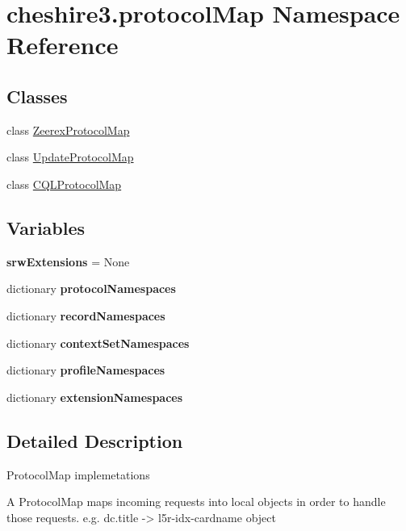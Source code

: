 \hypertarget{namespacecheshire3_1_1protocol_map}{\section{cheshire3.\-protocol\-Map Namespace Reference}
\label{namespacecheshire3_1_1protocol_map}
}
\subsection*{Classes}
\begin{DoxyCompactItemize}
\item 
class \hyperlink{classcheshire3_1_1protocol_map_1_1_zeerex_protocol_map}{Zeerex\-Protocol\-Map}
\item 
class \hyperlink{classcheshire3_1_1protocol_map_1_1_update_protocol_map}{Update\-Protocol\-Map}
\item 
class \hyperlink{classcheshire3_1_1protocol_map_1_1_c_q_l_protocol_map}{C\-Q\-L\-Protocol\-Map}
\end{DoxyCompactItemize}
\subsection*{Variables}
\begin{DoxyCompactItemize}
\item 
\hypertarget{namespacecheshire3_1_1protocol_map_ad95c47d945c97fd6183f2128605e6204}{{\bfseries srw\-Extensions} = None}\label{namespacecheshire3_1_1protocol_map_ad95c47d945c97fd6183f2128605e6204}

\item 
dictionary {\bfseries protocol\-Namespaces}
\item 
dictionary {\bfseries record\-Namespaces}
\item 
dictionary {\bfseries context\-Set\-Namespaces}
\item 
dictionary {\bfseries profile\-Namespaces}
\item 
dictionary {\bfseries extension\-Namespaces}
\end{DoxyCompactItemize}


\subsection{Detailed Description}
\begin{DoxyVerb}ProtocolMap implemetations

A ProtocolMap maps incoming requests into local objects in order to handle
those requests.
e.g. dc.title -> l5r-idx-cardname object
\end{DoxyVerb}
 

